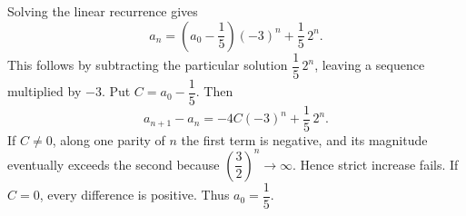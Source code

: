 Solving the linear recurrence gives
\[
a_n=\left(a_0-\dfrac{1}{5}\right)(-3)^n+\dfrac{1}{5}\,2^n.
\]
This follows by subtracting the particular solution $\dfrac{1}{5}\,2^n$, leaving a sequence multiplied by $-3$. Put $C=a_0-\dfrac{1}{5}$. Then
\[
a_{n+1}-a_n=-4C(-3)^n+\dfrac{1}{5}\,2^n.
\]
If $C\ne0$, along one parity of $n$ the first term is negative, and its magnitude eventually exceeds the second because $\left(\dfrac{3}{2}\right)^n\to\infty$. Hence strict increase fails. If $C=0$, every difference is positive. Thus $\boxed{a_0=\dfrac{1}{5}}$.
